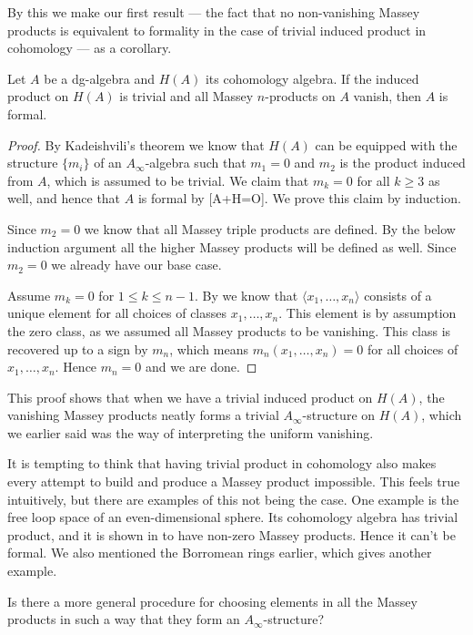 By this we make our first result — the fact that no non-vanishing Massey products is 
equivalent to formality in the case of trivial induced product in cohomology — as a 
corollary. 

\begin{corollary}
    Let $A$ be a dg-algebra and $H(A)$ its cohomology algebra. If the induced product on 
    $H(A)$ is trivial and all Massey $n$-products on $A$ vanish, then $A$ is formal.        
\end{corollary}

\begin{proof}
    By Kadeishvili's theorem we know that $H(A)$ can be equipped with the structure 
    $\{m_i\}$ of an $A_\infty$-algebra such that $m_1=0$ and $m_2$ is the product induced 
    from $A$, which is assumed to be trivial. We claim that $m_k = 0$ for all $k\geq 3$ 
    as well, and hence that $A$ is formal by [A+H=O]. We prove this claim by induction. 
    
    Since $m_2=0$ we know that all Massey triple products are defined. By the below 
    induction argument all the higher Massey products will be defined as well. Since 
    $m_2=0$ we already have our base case.
    
    Assume $m_k = 0$ for $1\leq k\leq n-1$. By \cite{detection} we know that 
    $\langle x_1, \ldots, x_n \rangle$ consists of a unique element for all choices of 
    classes $x_1, \ldots, x_n$. This element is by assumption the zero class, as we assumed 
    all Massey products to be vanishing. This class is recovered up to a sign by $m_n$, 
    which means $m_n(x_1,\ldots, x_n)=0$ for all choices of $x_1, \ldots, x_n$. Hence 
    $m_n=0$ and we are done. 
\end{proof}

This proof shows that when we have a trivial induced product on $H(A)$, the vanishing 
Massey products neatly forms a trivial $A_\infty$-structure on $H(A)$, which we earlier 
said was the way of interpreting the uniform vanishing.

It is tempting to think that having trivial product in cohomology also makes every attempt 
to build and produce a Massey product impossible. This feels true intuitively, but there 
are examples of this not being the case. One example is the free loop space of an 
even-dimensional sphere. Its cohomology algebra has trivial product, and it is shown in 
\cite{nonformal_loop} to have non-zero Massey products. Hence it can't be formal. We also 
mentioned the Borromean rings earlier, which gives another example. 

\begin{question}
Is there a more general procedure for choosing elements in all the Massey 
products in such a way that they form an $A_\infty$-structure?
\end{question}